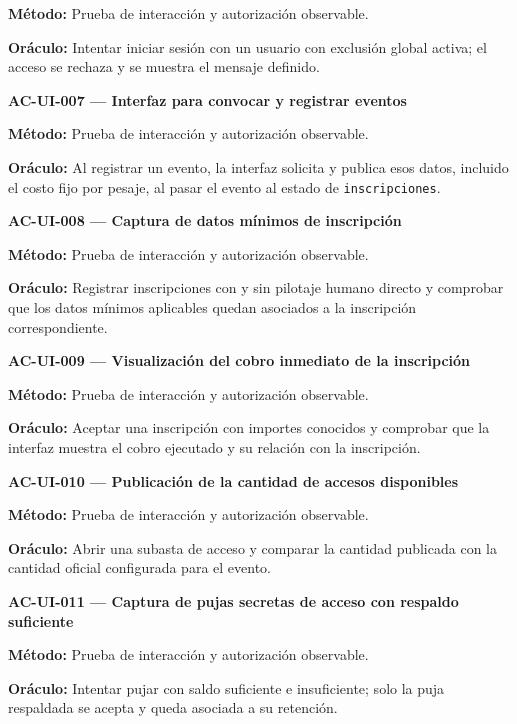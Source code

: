 \documentclass[10pt,letterpaper]{article}
\begin{document}
\textbf{Método:} Prueba de interacción y autorización observable.\par
\textbf{Oráculo:} Intentar iniciar sesión con un usuario con exclusión global activa; el acceso se rechaza y se muestra el mensaje definido.\par\vspace{0.45em}
\noindent\textbf{AC-UI-007 --- Interfaz para convocar y registrar eventos}\par
\textbf{Método:} Prueba de interacción y autorización observable.\par
\textbf{Oráculo:} Al registrar un evento, la interfaz solicita y publica esos datos, incluido el costo fijo por pesaje, al pasar el evento al estado de \texttt{inscripciones}.\par\vspace{0.45em}
\noindent\textbf{AC-UI-008 --- Captura de datos mínimos de inscripción}\par
\textbf{Método:} Prueba de interacción y autorización observable.\par
\textbf{Oráculo:} Registrar inscripciones con y sin pilotaje humano directo y comprobar que los datos mínimos aplicables quedan asociados a la inscripción correspondiente.\par\vspace{0.45em}
\noindent\textbf{AC-UI-009 --- Visualización del cobro inmediato de la inscripción}\par
\textbf{Método:} Prueba de interacción y autorización observable.\par
\textbf{Oráculo:} Aceptar una inscripción con importes conocidos y comprobar que la interfaz muestra el cobro ejecutado y su relación con la inscripción.\par\vspace{0.45em}
\noindent\textbf{AC-UI-010 --- Publicación de la cantidad de accesos disponibles}\par
\textbf{Método:} Prueba de interacción y autorización observable.\par
\textbf{Oráculo:} Abrir una subasta de acceso y comparar la cantidad publicada con la cantidad oficial configurada para el evento.\par\vspace{0.45em}
\noindent\textbf{AC-UI-011 --- Captura de pujas secretas de acceso con respaldo suficiente}\par
\textbf{Método:} Prueba de interacción y autorización observable.\par
\textbf{Oráculo:} Intentar pujar con saldo suficiente e insuficiente; solo la puja respaldada se acepta y queda asociada a su retención.\par\vspace{0.45em}
\end{document}
